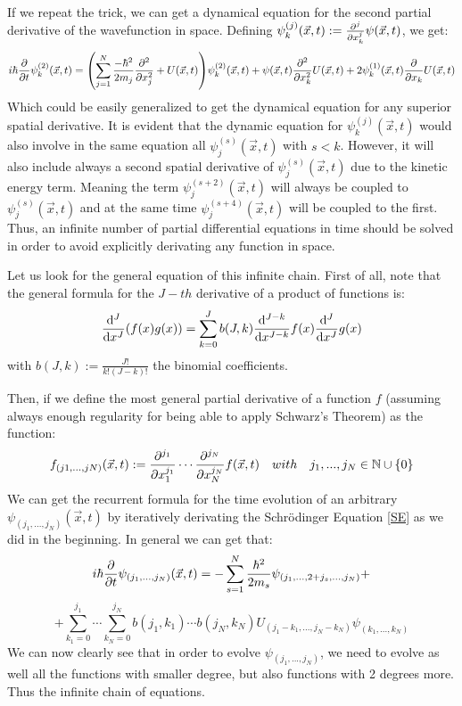 \documentclass[11pt, a4paper]{article} %
\newcommand{\N}{\mathbb{N}}
\begin{document}
If we repeat the trick, we can get a dynamical equation for the second partial derivative of the wavefunction in space.
Defining $\psi^{(j)}_k(\vec{x},t):=\pdv[j]{}{x_k}\psi(\vec{x},t)$, we get:
\begin{equation}
i\hbar \pdv{}{t}\psi^{(2)}_k(\vec{x},t) = \qty(\sum_{j=1}^N\frac{-\hbar^2}{2m_j}\pdv[2]{}{x_j}+U(\vec{x},t))\psi^{(2)}_k(\vec{x},t)+ \psi(\vec{x},t)\pdv[2]{}{x_k}U(\vec{x},t)+2\psi^{(1)}_k(\vec{x},t)\pdv{}{x_k}U(\vec{x},t)
\end{equation}
Which could be easily generalized to get the dynamical equation for any superior spatial derivative. It is evident that the dynamic equation for $\psi^{(j)}_k(\vec{x},t)$ would also involve in the same equation all $\psi^{(s)}_j(\vec{x},t)$ with $s<k$. However, it will also include always a second spatial derivative of $\psi^{(s)}_j(\vec{x},t)$ due to the kinetic energy term. Meaning the term $\psi^{(s+2)}_j(\vec{x},t)$ will always be coupled to $\psi^{(s)}_j(\vec{x},t)$ and at the same time $\psi^{(s+4)}_j(\vec{x},t)$ will be coupled to the first. Thus, an infinite number of partial differential equations in time should be solved in order to avoid explicitly derivating any function in space. 

Let us look for the general equation of this infinite chain. First of all, note that the general formula for the $J-th$ derivative of a product of functions is:
\begin{equation}
\dv[J]{}{x}\qty(f(x)g(x))=\sum_{k=0}^J b(J, k)\dv[J-k]{}{x}f(x)\dv[J]{}{x}g(x)
\end{equation}
with $b(J,k):=\frac{J!}{k!(J-k)!}$ the binomial coefficients.

Then, if we define the most general partial derivative of a function $f$ (assuming always enough regularity for being able to apply Schwarz's Theorem) as the function:
\begin{equation}\label{defPdv}
f_{(j1,...,jN)}(\vec{x},t):=\pdv[j_1]{}{x_1}\cdots\pdv[j_N]{}{x_N} f(\vec{x},t) \quad with\quad j_1,...,j_N\in \N\cup \{0\}
\end{equation}
We can get the recurrent formula for the time evolution of an arbitrary $\psi_{(j_1,...,j_N)}(\vec{x},t)$ by iteratively derivating the Schrödinger Equation \eqref{SE} as we did in the beginning. In general we can get that:
\begin{equation}\label{infchain.SE}
i\hbar \pdv{}{t}\psi_{(j_1,...,j_N)}(\vec{x},t)=-\sum_{s=1}^N\frac{\hbar^2}{2m_s}\psi_{(j_1,...,2+j_s,...,j_N)}+
\end{equation}
$$
+\sum_{k_1=0}^{j_1}\cdots\sum_{k_N=0}^{j_N} b(j_1,k_1)\cdots b(j_N,k_N)U_{(j_1-k_1,...,j_N-k_N)}\psi_{(k_1,...,k_N)}
$$
We can now clearly see that in order to evolve $\psi_{(j_1,...,j_N)}$, we need to evolve as well all the functions with smaller degree, but also functions with 2 degrees more. Thus the infinite chain of equations.
\end{document}
